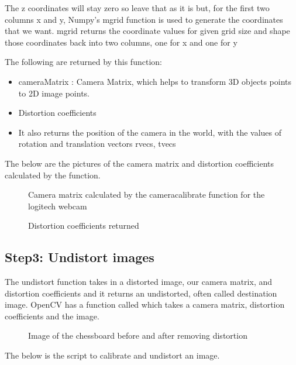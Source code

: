 The z coordinates will stay zero so leave that as it is but, for the first two columns x and y, Numpy’s mgrid function is used to generate the coordinates that we want. mgrid returns the coordinate values for given grid size and shape those coordinates back into two columns, one for x and one for y

The following are returned by this function: 
\begin{itemize}
	\item cameraMatrix : Camera Matrix, which helps to transform 3D objects points to 2D image points.
	\item Distortion coefficients
	\item It also returns the position of the camera in the world, with the values of rotation and translation vectors rvecs, tvecs
\end{itemize}

The below are the pictures of the camera matrix and distortion coefficients calculated by the function. 
\begin{figure}[H]
	\centering
	\caption{Camera matrix calculated by the cameracalibrate function for the logitech webcam}
\end{figure}
\begin{figure}[H]
	\centering
	\caption{Distortion coefficients returned}
\end{figure}

\subsection{Step3: Undistort images}

The undistort function takes in a distorted image, our camera matrix, and distortion coefficients and it returns an undistorted, often called destination image.
OpenCV has a function called  which takes a camera matrix, distortion coefficients and the image.\\ 

\begin{figure}[H]
	\centering
	\caption{Image of the chessboard before and after removing distortion}
\end{figure}

The below is the script to calibrate and undistort an image.

